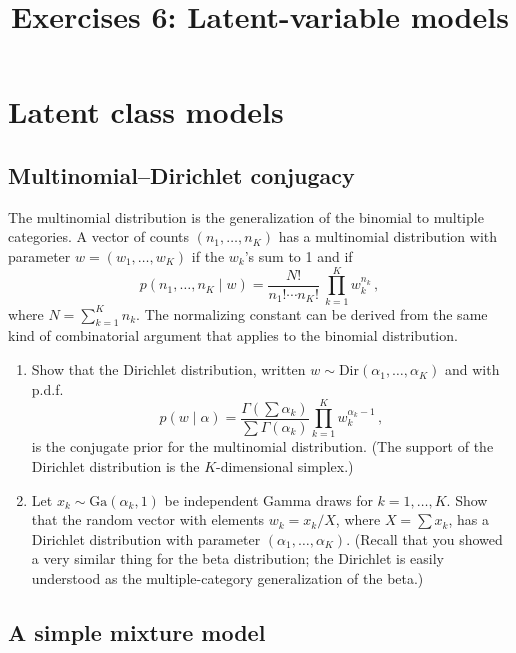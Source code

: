 \documentclass{mynotes}
\title[Exercises 6 $\cdot$ SSC 383D]{Exercises 6: Latent-variable models}
\date{}  %
\begin{document}
\maketitle%

\section{Latent class models}

\subsection{Multinomial--Dirichlet conjugacy}

The multinomial distribution is the generalization of the binomial to multiple categories.  A vector of counts $(n_1, \ldots, n_K)$ has a multinomial distribution with parameter $w = (w_1, \ldots, w_K)$ if the $w_k$'s sum to 1 and if
$$
p(n_1, \ldots, n_K \mid w) = \frac{N!}{n_1! \cdots n_K!} \ \prod_{k=1}^K w_k^{n_k} \, ,
$$
where $N = \sum_{k=1}^K n_k$.  The normalizing constant can be derived from the same kind of combinatorial argument that applies to the binomial distribution.

\begin{enumerate}
\item Show that the Dirichlet distribution, written $w \sim \mbox{Dir}(\alpha_1, \ldots, \alpha_K)$ and with p.d.f.
$$
p(w \mid \alpha) = \frac{\Gamma(\sum \alpha_k) }{\sum \Gamma(\alpha_k) } \prod_{k=1}^K w_k^{\alpha_k -1} \, ,
$$
is the conjugate prior for the multinomial distribution.  (The support of the Dirichlet distribution is the $K$-dimensional simplex.)
\item Let $x_k \sim \mbox{Ga}(\alpha_k, 1)$ be independent Gamma draws for $k=1, \ldots, K$.  Show that the random vector with elements $w_k = x_k/X$, where $X = \sum{x_k}$, has a Dirichlet distribution with parameter $(\alpha_1, \ldots, \alpha_K)$.  (Recall that you showed a very similar thing for the beta distribution; the Dirichlet is easily understood as the multiple-category generalization of the beta.)
\end{enumerate}

\subsection{A simple mixture model}
\end{document}
